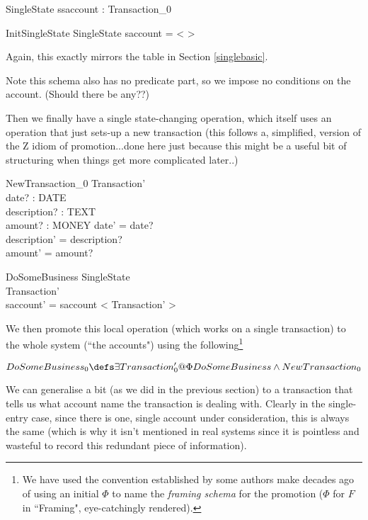 \documentclass[11pt]{amsart}
\begin{document}
\begin{schema}{SingleState}
ssaccount : \seq Transaction_0
\end{schema}

\begin{schema}{InitSingleState}
SingleState
\where
saccount = < >
\end{schema}

Again, this exactly mirrors the table in Section \ref{singlebasic}. 

Note this schema also has no predicate part, so we impose no conditions on the account. (Should there be any??)

Then we finally have a single state-changing operation, which itself uses an operation that just sets-up a new transaction (this follows a, simplified, version of the Z idiom of promotion...done here just because this might be a useful bit of structuring when things get more complicated later..)

\begin{schema}{NewTransaction_0}
Transaction'\\
date? : DATE\\
description? : TEXT\\
amount? : MONEY
\where
date' = date?\\
description' = description?\\
amount' = amount?
\end{schema}

\begin{schema}{\Phi DoSomeBusiness}
\Delta SingleState\\
Transaction'\\
\where
saccount' = saccount \cat < \theta Transaction' >
\end{schema}

We then promote this local operation (which works on a single transaction) to the whole system (``the accounts") using the following\footnote{We have used the convention established by some authors make decades ago of using an initial $\Phi$ to name the \emph{framing schema} for the promotion ($\Phi$ for $F$ in ``Framing", eye-catchingly rendered).}

\[
DoSomeBusiness_0 \defs \exists Transaction_0' @ \Phi DoSomeBusiness \land New Transaction_0
\]

We can generalise a bit (as we did in the previous section) to a transaction that tells us what account name the transaction is dealing with. Clearly in the single-entry case, since there is one, single account under consideration, this is always the same (which is why it isn't mentioned in real systems since it is pointless and wasteful to record this redundant piece of information).
\end{document}
